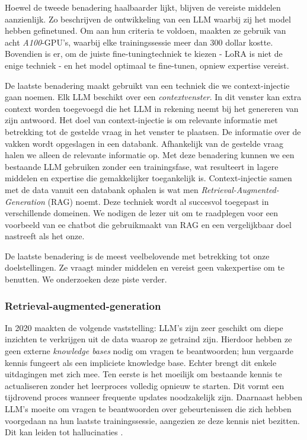 Hoewel de tweede benadering haalbaarder lijkt, blijven de vereiste middelen aanzienlijk. Zo beschrijven \textcite{Chiang2023} de ontwikkeling van een LLM waarbij zij het model hebben gefinetuned. Om aan hun criteria te voldoen, maakten ze gebruik van acht \emph{A100}-GPU's, waarbij elke trainingssessie meer dan 300 dollar kostte. Bovendien is er, om de juiste fine-tuningtechniek te kiezen - LoRA is niet de enige techniek - en het model optimaal te fine-tunen, opniew expertise vereist.

De laatste benadering maakt gebruikt van een techniek die we context-injectie gaan noemen. Elk LLM beschikt over een \emph{contextvenster}. In dit venster kan extra context worden toegevoegd die het LLM in rekening neemt bij het genereren van zijn antwoord. Het doel van context-injectie is om relevante informatie met betrekking tot de gestelde vraag in het venster te plaatsen. De informatie over de vakken wordt opgeslagen in een databank. Afhankelijk van de gestelde vraag halen we alleen de relevante informatie op. Met deze benadering kunnen we een bestaande LLM gebruiken zonder een trainingsfase, wat resulteert in lagere middelen en expertise die gemakkelijker toegankelijk is. Context-injectie samen met de data vanuit een databank ophalen is wat men \emph{Retrieval-Augmented-Generation} (RAG) noemt. Deze techniek wordt al succesvol toegepast in verschillende domeinen. We nodigen de lezer uit om \textcite{Wang2024} te raadplegen voor een voorbeeld van ee chatbot die gebruikmaakt van RAG en een vergelijkbaar doel nastreeft als het onze. 

De laatste benadering is de meest veelbelovende met betrekking tot onze doelstellingen. Ze vraagt minder middelen en vereist geen vakexpertise om te benutten. We onderzoeken deze piste verder.

\subsubsection{Retrieval-augmented-generation}

In 2020 maakten \textcite{Lewis2020} de volgende vaststelling: LLM's zijn zeer geschikt om diepe inzichten te verkrijgen uit de data waarop ze getraind zijn. Hierdoor hebben ze geen externe \emph{knowledge bases} nodig om vragen te beantwoorden; hun vergaarde kennis fungeert als een impliciete knowledge base. Echter brengt dit enkele uitdagingen met zich mee. Ten eerste is het moeilijk om bestaande kennis te actualiseren zonder het leerproces volledig opnieuw te starten. Dit vormt een tijdrovend proces wanneer frequente updates noodzakelijk zijn. Daarnaast hebben LLM's moeite om vragen te beantwoorden over gebeurtenissen die zich hebben voorgedaan na hun laatste trainingssessie, aangezien ze deze kennis niet bezitten. Dit kan leiden tot hallucinaties \autocite{Gao2023}.

